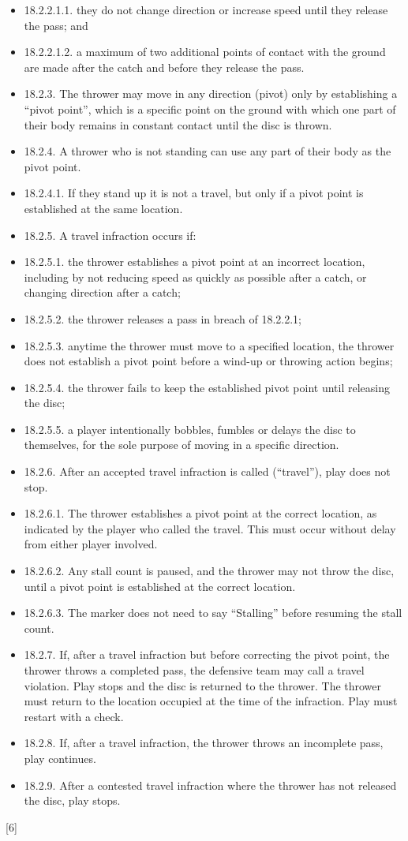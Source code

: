 \begin{itemize}
    \item 18.2.2.1.1. they do not change direction or increase speed until they release the pass; and
    \item 18.2.2.1.2. a maximum of two additional points of contact with the ground are made after the catch and before they release the pass.
    \item 18.2.3. The thrower may move in any direction (pivot) only by establishing a “pivot point”, which is a specific point on the ground with which one part of their body remains in constant contact until the disc is thrown.
    \item 18.2.4. A thrower who is not standing can use any part of their body as the pivot point.
    \item 18.2.4.1. If they stand up it is not a travel, but only if a pivot point is established at the same location.
    \item 18.2.5. A travel infraction occurs if:
    \item 18.2.5.1. the thrower establishes a pivot point at an incorrect location, including by not reducing speed as quickly as possible after a catch, or changing direction after a catch;
    \item 18.2.5.2. the thrower releases a pass in breach of 18.2.2.1;
    \item 18.2.5.3. anytime the thrower must move to a specified location, the thrower does not establish a pivot point before a wind-up or throwing action begins;
    \item 18.2.5.4. the thrower fails to keep the established pivot point until releasing the disc;
    \item 18.2.5.5. a player intentionally bobbles, fumbles or delays the disc to themselves, for the sole purpose of moving in a specific direction.
    \item 18.2.6. After an accepted travel infraction is called (“travel”), play does not stop.
    \item 18.2.6.1. The thrower establishes a pivot point at the correct location, as indicated by the player who called the travel. This must occur without delay from either player involved.
    \item 18.2.6.2. Any stall count is paused, and the thrower may not throw the disc, until a pivot point is established at the correct location.
    \item 18.2.6.3. The marker does not need to say “Stalling” before resuming the stall count.
    \item 18.2.7. If, after a travel infraction but before correcting the pivot point, the thrower throws a completed pass, the defensive team may call a travel violation. Play stops and the disc is returned to the thrower. The thrower must return to the location occupied at the time of the infraction. Play must restart with a check.
    \item 18.2.8. If, after a travel infraction, the thrower throws an incomplete pass, play continues.
    \item 18.2.9. After a contested travel infraction where the thrower has not released the disc, play stops.
\end{itemize}
\begin{center}[6]\end{center}
